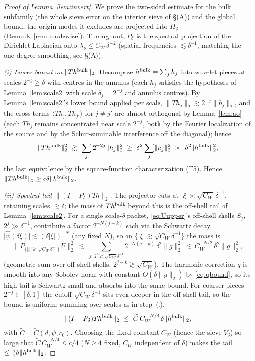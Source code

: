 \documentclass[11pt]{article}
\theoremstyle{remark}
\newcommand{\norm}[1]{\lVert #1\rVert}
\newcommand{\abs}[1]{\lvert #1\rvert}
\newcommand{\inner}[2]{\langle #1,#2\rangle}
\newcommand{\SET}[1]{\{#1\}}
\begin{document}
\begin{proof}[Proof of Lemma~\ref{lem:invert}]
We prove the two-sided estimate for the bulk subfamily (the whole sieve
error on the interior sieve of \S(A)) and the global bound; the origin
modes it excludes are projected into $\Pi_\delta$
(Remark~\ref{rem:modewise}). Throughout, $P_\delta$ is the spectral
projection of the Dirichlet Laplacian onto
$\lambda_\nu\le C_W\,\delta^{-2}$ (spatial frequencies $\lesssim
\delta^{-1}$, matching the one-degree smoothing; see \S(A)).

\smallskip
\noindent\emph{(i) Lower bound on $\norm{Th^{\rm bulk}}_2$.} Decompose
$h^{\rm bulk}=\sum_j h_j$ into wavelet pieces at scales
$2^{-j}\ge\delta$ with centres in the annulus (each $h_j$ satisfies the
hypotheses of Lemma~\ref{lem:scale2} with scale $\delta_j=2^{-j}$ and
annulus centres). By Lemma~\ref{lem:scale2}'s lower bound applied per
scale, $\norm{Th_j}_2\gtrsim2^{-j}\norm{h_j}_2$, and the cross-terms
$\inner{Th_j}{Th_{j'}}$ for $j\ne j'$ are almost-orthogonal by
Lemma~\ref{lem:ao} (each $Th_j$ remains concentrated near scale
$2^{-j}$, both by the Fourier localization of the source and by the
Schur-summable interference off the diagonal); hence
\[
\norm{Th^{\rm bulk}}_2^{2}\ \gtrsim\ \sum_j 2^{-2j}\norm{h_j}_2^{2}
\ \ge\ \delta^{2}\sum_j\norm{h_j}_2^{2}
\ \asymp\ \delta^{2}\norm{h^{\rm bulk}}_2^{2},
\]
the last equivalence by the square-function characterization (T5). Hence
$\norm{Th^{\rm bulk}}_2\ge c\delta\norm{h^{\rm bulk}}_2$.

\smallskip
\noindent\emph{(ii) Spectral tail $\norm{(I-P_\delta)Th}_2$.} The
projector cuts at $\abs\xi\asymp\sqrt{C_W}\,\delta^{-1}$, retaining
scales $\gtrsim\delta$; the mass of $Th^{\rm bulk}$ beyond this is the
off-shell tail of Lemma~\ref{lem:scale2}. For a single scale-$\delta$
packet, \eqref{eq:Uupper}'s off-shell shells $S_j$, $2^j\gg\delta^{-1}$,
contribute a factor $2^{-N(j-k)}$ each via the Schwartz decay
$\abs{\widehat\psi(\delta\xi)}\lesssim(\delta\abs\xi)^{-N}$ (any fixed
$N$), so on $\SET{\abs\xi\gtrsim\sqrt{C_W}\delta^{-1}}$ the mass is
\[
\norm{P_{\SET{\abs\xi\gtrsim\sqrt{C_W}\delta^{-1}}}\,U}_2^{2}
\ \lesssim\ \sum_{j:\,2^{j}\gtrsim\sqrt{C_W}\delta^{-1}}2^{-N(j-k)}\,
\delta^{2}\norm{g}_2^{2}
\ \lesssim\ C_W^{-N/2}\,\delta^{2}\norm{g}_2^{2},
\]
(geometric sum over off-shell shells, $2^{j-k}\gtrsim\sqrt{C_W}$). The
harmonic correction $q$ is smooth into any Sobolev norm with constant
$O(\delta\norm g_2)$ by \eqref{eq:qbound}, so its high tail is
Schwartz-small and absorbs into the same bound. For coarser pieces
$2^{-j}\in[\delta,1]$ the cutoff $\sqrt{C_W}\delta^{-1}$ sits even
deeper in the off-shell tail, so the bound is uniform; summing over
scales as in step~(i),
\begin{equation}\label{eq:spectail}
\norm{(I-P_\delta)Th^{\rm bulk}}_2
\ \le\ \widetilde C\,C_W^{-N/4}\,\delta\norm{h^{\rm bulk}}_2,
\end{equation}
with $\widetilde C=\widetilde C(d,\psi,c_0)$. Choosing the fixed constant
$C_W$ (hence the sieve $V_\delta$) so large that $\widetilde
C\,C_W^{-N/4}\le c/4$ ($N\ge4$ fixed, $C_W$ independent of $\delta$)
makes the tail $\le\tfrac{c}{4}\delta\norm{h^{\rm bulk}}_2$.


\end{proof}
\end{document}
